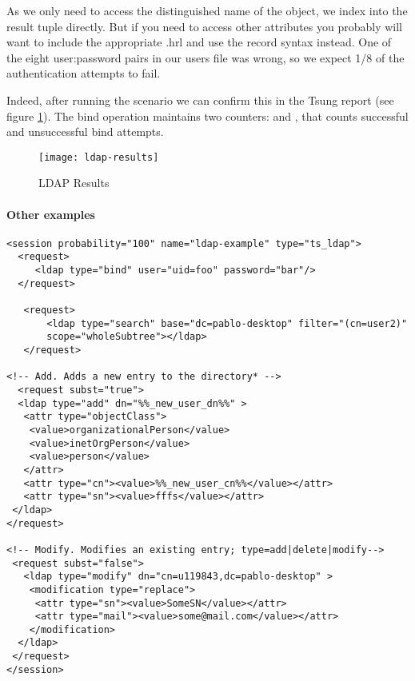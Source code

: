 \documentclass{TSUNG-en}
\begin{document}
As we only need to access the distinguished name of the object, we index into the result tuple directly. But if you need to access other attributes you probably will want to include the appropriate .hrl and use the record syntax instead. One of the eight user:password pairs in our users file was wrong, so we expect 1/8 of the authentication attempts to fail.

Indeed, after running the scenario we can confirm this in the Tsung
report (see figure \ref{fig:ldap:results}). The bind operation maintains two
counters:  and ,
that counts successful and unsuccessful bind attempts.

\begin{figure}[htb]
  \begin{center}
    \texttt{[image: ldap-results]}
    \end{center}
      \caption{LDAP Results}
    \label{fig:ldap:results}
\end{figure}

\paragraph{Other examples}

\begin{Verbatim}
<session probability="100" name="ldap-example" type="ts_ldap">
  <request>
     <ldap type="bind" user="uid=foo" password="bar"/>
  </request>

   <request>
       <ldap type="search" base="dc=pablo-desktop" filter="(cn=user2)"
       scope="wholeSubtree"></ldap>
   </request>

<!-- Add. Adds a new entry to the directory* -->
  <request subst="true">
  <ldap type="add" dn="%%_new_user_dn%%" >
   <attr type="objectClass">
    <value>organizationalPerson</value>
    <value>inetOrgPerson</value>
    <value>person</value>
   </attr>
   <attr type="cn"><value>%%_new_user_cn%%</value></attr>
   <attr type="sn"><value>fffs</value></attr>
 </ldap>
</request>

<!-- Modify. Modifies an existing entry; type=add|delete|modify-->
 <request subst="false">
   <ldap type="modify" dn="cn=u119843,dc=pablo-desktop" >
    <modification type="replace">
     <attr type="sn"><value>SomeSN</value></attr>
     <attr type="mail"><value>some@mail.com</value></attr>
    </modification>
  </ldap>
 </request>
</session>
\end{Verbatim}
\end{document}
